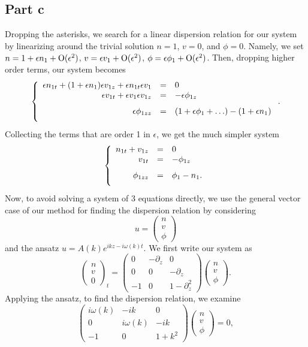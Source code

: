 \documentclass{article}
\begin{document}
\subsection{Part c}
Dropping the asterisks, we search for a linear dispersion relation for our system by linearizing around the trivial solution $n=1$, $v=0$, and $\phi=0$. Namely, we set $n=1+\epsilon n_1+\operatorname{O}(\epsilon^2)$, $v=\epsilon v_1+\operatorname{O}(\epsilon^2)$, $\phi=\epsilon \phi_1+\operatorname{O}(\epsilon^2)$. Then, dropping higher order terms, our system becomes
\[
\sys{
	\ds \epsilon n_{1t}+(1+\epsilon n_1)\epsilon v_{1z}+\epsilon n_{1t}\epsilon v_1&=&0\\
	\vs\ds \epsilon v_{1t}+\epsilon v_1\epsilon v_{1z}&=&\ds -\epsilon\phi_{1z}\\
	\vs \ds \epsilon\phi_{1zz}&=&\ds \left(1+\epsilon\phi_1+\ldots\right)-(1+\epsilon n_1)
}.
\]
Collecting the terms that are order 1 in $\epsilon$, we get the much simpler system
\[
 \sys{
 	\ds n_{1t}+v_{1z}&=&0\\
 	\vs\ds v_{1t}&=&\ds -\phi_{1z}\\
 	\vs \ds \phi_{1zz}&=&\ds \phi_1-n_1.
 }
\]
Now, to avoid solving a system of 3 equations directly, we use the general vector case of our method for finding the dispersion relation by considering 
\[
u=\begin{pmatrix}
	n\\v\\ \phi
\end{pmatrix}
\]
and the ansatz $u=A(k)e^{ikz-i\omega(k)t}$. We first write our system as
\[
\begin{pmatrix}
	n\\v\\ 0
\end{pmatrix}_t=\begin{pmatrix}
	0 &-\partial_z &0\\
	0 &0 &-\partial_z\\
	-1 &0 &1-\partial^2_z
\end{pmatrix}\begin{pmatrix}
n\\v\\ \phi
\end{pmatrix}.
\]
Applying the ansatz, to find the dispersion relation, we examine 
\[
\begin{pmatrix}
i\omega(k) &-ik &0\\
0 &i\omega(k) &-ik\\
-1 &0 &1+k^2
\end{pmatrix}\begin{pmatrix}
n\\v\\ \phi
\end{pmatrix}=0,
\]
\end{document}
